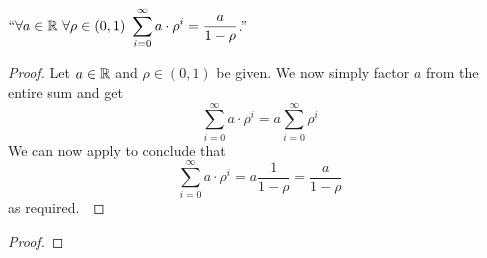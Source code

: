         \begin{corollary}
            $``\forall a \in \mathbb{R} \ \forall \rho \in (0, 1) \
            \displaystyle\sum_{i = 0}^{\infty} a \cdot \rho^i = \dfrac{a}{1 - \rho}$.''
        \end{corollary}
        \begin{proof}
            Let $a \in \mathbb{R}$ and $\rho \in (0, 1)$ be given. We now simply factor
            $a$ from the entire sum and get
            \[
                \sum_{i = 0}^{\infty} a \cdot \rho^i = a \sum_{i = 0}^{\infty} \rho^i
            \]
            We can now apply  to conclude
            that
            \[
                \sum_{i = 0}^{\infty} a \cdot \rho^i = a \frac{1}{1 - \rho} = \frac{a}{1 - \rho}
            \]
            as required.~\QED
        \end{proof}
        \begin{theorem}
        \end{theorem}
        \begin{proof}
        \end{proof}
